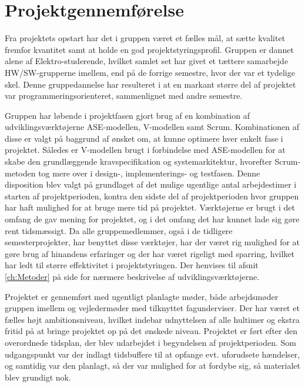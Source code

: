 \section{Projektgennemførelse} \label{ch:Projektgennemfoerelse}

Fra projektets opstart har det i gruppen været et fælles mål, at sætte kvalitet fremfor kvantitet samt at holde en god projektstyringsprofil.  
Gruppen er dannet alene af Elektro-studerende, hvilket samlet set har givet et tættere samarbejde HW/SW-grupperne imellem, end på de forrige semestre, hvor der var et tydelige skel. 
Denne gruppedannelse har resulteret i at en markant større del af projektet var programmeringsorienteret, sammenlignet med andre semestre. 

Gruppen har løbende i projektfasen gjort brug af en kombination af udviklingsværktøjerne ASE-modellen, V-modellen samt Scrum. 
Kombinationen af disse er valgt på baggrund af ønsket om, at kunne optimere hver enkelt fase i projektet.
Således er V-modellen brugt i forbindelse med ASE-modellen for at skabe den grundlæggende kravspecifikation og systemarkitektur, hvorefter Scrum-metoden tog mere over i design-, implementerings- og testfasen. 
Denne disposition blev valgt på grundlaget af det mulige ugentlige antal arbejdestimer i starten af projektperioden, kontra den sidste del af projektperioden hvor gruppen har haft mulighed for at bruge mere tid på projektet.
Værktøjerne er brugt i det omfang de gav mening for projektet, og i det omfang det har kunnet lade sig gøre rent tidsmæssigt. 
Da alle gruppemedlemmer, også i de tidligere semesterprojekter, har benyttet disse værktøjer, har der været rig mulighed for at gøre brug af hinandens erfaringer og der har været rigeligt med sparring, hvilket har ledt til større effektivitet i projektstyringen. 
Der henvises til afsnit \ref{ch:Metoder}  på side \pageref{ch:Metoder} for nærmere beskrivelse af udviklingsværktøjerne.

Projektet er gennemført med ugentligt planlagte møder, både arbejdsmøder gruppen imellem og vejledermøder med tilknyttet fagunderviser. Der har været et fælles højt ambitionsniveau, hvilket indebar udnyttelsen af alle hultimer og ekstra fritid på at bringe projektet op på det ønskede niveau. 
Projektet er ført efter den overordnede tidsplan, der blev udarbejdet i begyndelsen af projektperioden\cite{lib:Tidsplan}. Som udgangspunkt var der indlagt tidsbuffere til at opfange evt. uforudsete hændelser, og samtidig var den planlagt, så der var mulighed for at fordybe sig, så materialet blev grundigt nok.


